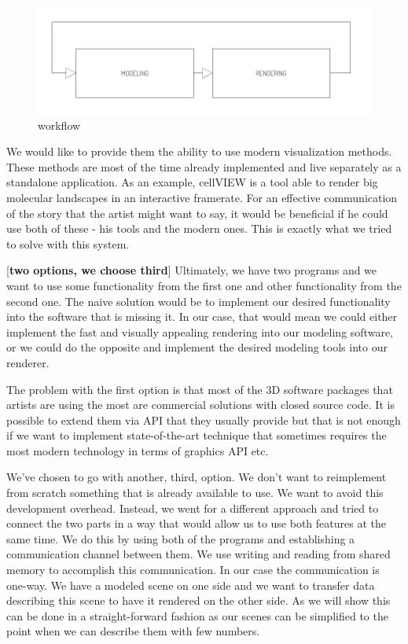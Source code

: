 \documentclass[
  digital, %
  table,   %
  nolof,     %
  nolot,     %
]{fithesis3}
\begin{document}
\begin{figure}
  \centering
  \includegraphics[scale=0.8]{images/pipeline.pdf}
  \caption{workflow}
  \label{fig:workflow}
\end{figure}

We would like to provide them the ability to use modern visualization methods. These methods are most of the time already implemented and live separately as a standalone application. As an example, cellVIEW is a tool able to render big molecular landscapes in an interactive framerate. For an effective communication of the story that the artist might want to say, it would be beneficial if he could use both of these - his tools and the modern ones. This is exactly what we tried to solve with this system.

[\textbf{two options, we choose third}]
Ultimately, we have two programs and we want to use some functionality from the first one and other functionality from the second one. The naive solution would be to implement our desired functionality into the software that is missing it. In our case, that would mean we could either implement the fast and visually appealing rendering into our modeling software, or we could do the opposite and implement the desired modeling tools into our renderer.

The problem with the first option is that most of the 3D software packages that artists are using the most are commercial solutions with closed source code. It is possible to extend them via API that they usually provide but that is not enough if we want to implement state-of-the-art technique that sometimes requires the most modern technology in terms of graphics API etc.

We've chosen to go with another, third, option. We don't want to reimplement from scratch something that is already available to use. We want to avoid this development overhead. Instead, we went for a different approach and tried to connect the two parts in a way that would allow us to use both features at the same time. We do this by using both of the programs and establishing a communication channel between them. We use writing and reading from shared memory to accomplish this communication. In our case the communication is one-way. We have a modeled scene on one side and we want to transfer data describing this scene to have it rendered on the other side. As we will show this can be done in a straight-forward fashion as our scenes can be simplified to the point when we can describe them with few numbers.
\end{document}
